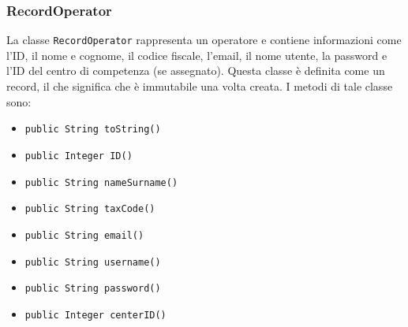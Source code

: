 \subsubsection{RecordOperator}
La classe \texttt{RecordOperator} rappresenta un operatore e contiene informazioni come l'ID, il nome e cognome, il codice fiscale, l'email, il nome utente, la password e l'ID del centro di competenza (se assegnato).
Questa classe è definita come un record, il che significa che è immutabile una volta creata.
I metodi di tale classe sono:
\begin{itemize}
    \item \texttt{public String toString()}
    \item \texttt{public Integer ID()}
    \item \texttt{public String nameSurname()}
    \item \texttt{public String taxCode()}
    \item \texttt{public String email()}
    \item \texttt{public String username()}
    \item \texttt{public String password()}
    \item \texttt{public Integer centerID()}
\end{itemize}

